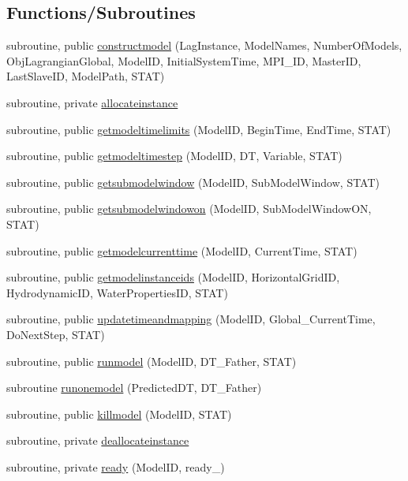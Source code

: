 \subsection*{Functions/\+Subroutines}
\begin{DoxyCompactItemize}
\item 
subroutine, public \mbox{\hyperlink{namespacemodulemodel_a26ba9ff74ca1066f7a87bd019c76b1ed}{constructmodel}} (Lag\+Instance, Model\+Names, Number\+Of\+Models, Obj\+Lagrangian\+Global, Model\+ID, Initial\+System\+Time, M\+P\+I\+\_\+\+ID, Master\+ID, Last\+Slave\+ID, Model\+Path, S\+T\+AT)
\item 
subroutine, private \mbox{\hyperlink{namespacemodulemodel_a5bbc8de2114f1ac7367a9db6d923e85a}{allocateinstance}}
\item 
subroutine, public \mbox{\hyperlink{namespacemodulemodel_a4273c6982391135a62686fbcf6a0861c}{getmodeltimelimits}} (Model\+ID, Begin\+Time, End\+Time, S\+T\+AT)
\item 
subroutine, public \mbox{\hyperlink{namespacemodulemodel_a548beb7d8ae7799facee13efde759d64}{getmodeltimestep}} (Model\+ID, DT, Variable, S\+T\+AT)
\item 
subroutine, public \mbox{\hyperlink{namespacemodulemodel_a61debfb6b3b629e1cd4bbdfe3c1c1ad1}{getsubmodelwindow}} (Model\+ID, Sub\+Model\+Window, S\+T\+AT)
\item 
subroutine, public \mbox{\hyperlink{namespacemodulemodel_a2bb34f8b006f66681bc7e7276eb4579e}{getsubmodelwindowon}} (Model\+ID, Sub\+Model\+Window\+ON, S\+T\+AT)
\item 
subroutine, public \mbox{\hyperlink{namespacemodulemodel_a16524bfd3d2f97fbf9b45e5e99e495e8}{getmodelcurrenttime}} (Model\+ID, Current\+Time, S\+T\+AT)
\item 
subroutine, public \mbox{\hyperlink{namespacemodulemodel_a542c4b413e51723c7c3826e7a1e3b8a6}{getmodelinstanceids}} (Model\+ID, Horizontal\+Grid\+ID, Hydrodynamic\+ID, Water\+Properties\+ID, S\+T\+AT)
\item 
subroutine, public \mbox{\hyperlink{namespacemodulemodel_a4eb372bc7bfa08656aec97c250f8cf7b}{updatetimeandmapping}} (Model\+ID, Global\+\_\+\+Current\+Time, Do\+Next\+Step, S\+T\+AT)
\item 
subroutine, public \mbox{\hyperlink{namespacemodulemodel_a16a07d5b28a4877790acec46aed111b6}{runmodel}} (Model\+ID, D\+T\+\_\+\+Father, S\+T\+AT)
\item 
subroutine \mbox{\hyperlink{namespacemodulemodel_ab22d85061a595a03c83c11766cba5587}{runonemodel}} (Predicted\+DT, D\+T\+\_\+\+Father)
\item 
subroutine, public \mbox{\hyperlink{namespacemodulemodel_a23647852257627fb606f6868bc295162}{killmodel}} (Model\+ID, S\+T\+AT)
\item 
subroutine, private \mbox{\hyperlink{namespacemodulemodel_aa1baf5876ac43380b98e011bcf1517da}{deallocateinstance}}
\item 
subroutine, private \mbox{\hyperlink{namespacemodulemodel_af5d93bbd065add89f5cd52475a40e7fc}{ready}} (Model\+ID, ready\+\_\+)
\end{DoxyCompactItemize}
